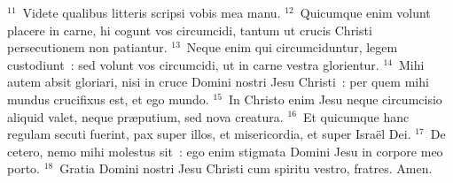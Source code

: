 ${}^{11}$~Videte qualibus litteris scripsi vobis mea manu.
${}^{12}$~Quicumque enim volunt placere in carne, hi cogunt vos circumcidi, tantum ut crucis Christi persecutionem non patiantur.
${}^{13}$~Neque enim qui circumciduntur, legem custodiunt~: sed volunt vos circumcidi, ut in carne vestra glorientur.
${}^{14}$~Mihi autem absit gloriari, nisi in cruce Domini nostri Jesu Christi~: per quem mihi mundus crucifixus est, et ego mundo.
${}^{15}$~In Christo enim Jesu neque circumcisio aliquid valet, neque pr\ae putium, sed nova creatura.
${}^{16}$~Et quicumque hanc regulam secuti fuerint, pax super illos, et misericordia, et super Isra\"el Dei.
${}^{17}$~De cetero, nemo mihi molestus sit~: ego enim stigmata Domini Jesu in corpore meo porto.
${}^{18}$~Gratia Domini nostri Jesu Christi cum spiritu vestro, fratres. Amen.
